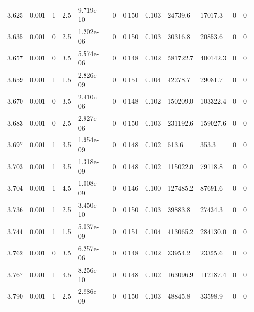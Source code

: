 \documentclass[preview]{standalone}
\begin{document}
{{{{{{{{\begin{tabular}{L{1.2cm}C{1.2cm} C{0.3cm}C{0.5cm} C{1.4cm}C{1.4cm} C{1.4cm}C{1.4cm} C{1.6cm}C{1.6cm} C{1.6cm}C{1.6cm}}
  3.625  &  0.001  & 1     & 2.5 &  9.719e-10  & 0  &  0.150&   0.103& 24739.6 & 17017.3   &  0 & 0  \\ 
  3.635  &  0.001  & 0     & 2.5 &  1.202e-06  & 0  &  0.150&   0.103& 30316.8 & 20853.6   &  0 & 0  \\ 
  3.657  &  0.001  & 0     & 3.5 &  5.574e-06  & 0  &  0.148&   0.102& 581722.7 & 400142.3   &  0 & 0  \\ 
  3.659  &  0.001  & 1     & 1.5 &  2.826e-09  & 0  &  0.151&   0.104& 42278.7 & 29081.7   &  0 & 0  \\ 
  3.670  &  0.001  & 0     & 3.5 &  2.410e-06  & 0  &  0.148&   0.102& 150209.0 & 103322.4   &  0 & 0  \\ 
  3.683  &  0.001  & 0     & 2.5 &  2.927e-06  & 0  &  0.150&   0.103& 231192.6 & 159027.6   &  0 & 0  \\ 
  3.697  &  0.001  & 1     & 3.5 &  1.954e-09  & 0  &  0.148&   0.102& 513.6 & 353.3   &  0 & 0  \\ 
  3.703  &  0.001  & 1     & 3.5 &  1.318e-09  & 0  &  0.148&   0.102& 115022.0 & 79118.8   &  0 & 0  \\ 
  3.704  &  0.001  & 1     & 4.5 &  1.008e-09  & 0  &  0.146&   0.100& 127485.2 & 87691.6   &  0 & 0  \\ 
  3.736  &  0.001  & 1     & 2.5 &  3.450e-10  & 0  &  0.150&   0.103& 39883.8 & 27434.3   &  0 & 0  \\ 
  3.744  &  0.001  & 1     & 1.5 &  5.037e-09  & 0  &  0.151&   0.104& 413065.2 & 284130.0   &  0 & 0  \\ 
  3.762  &  0.001  & 0     & 3.5 &  6.257e-06  & 0  &  0.148&   0.102& 33954.2 & 23355.6   &  0 & 0  \\ 
  3.767  &  0.001  & 1     & 3.5 &  8.256e-10  & 0  &  0.148&   0.102& 163096.9 & 112187.4   &  0 & 0  \\ 
  3.790  &  0.001  & 1     & 2.5 &  2.886e-09  & 0  &  0.150&   0.103& 48845.8 & 33598.9   &  0 & 0  \\ 
\hline 
\end{tabular} 

}}}}}}}}
\end{document}
